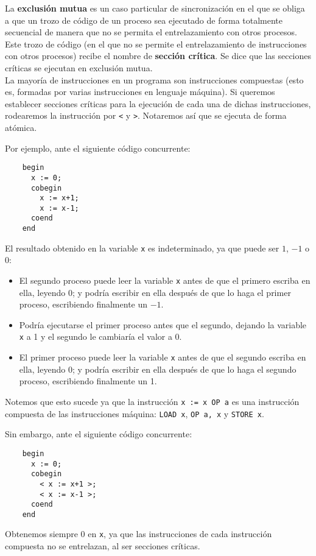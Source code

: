 La \textbf{exclusión mutua} es un caso particular de sincronización en el que se obliga a que un trozo de código de un proceso sea ejecutado de forma totalmente secuencial de manera que no se permita el entrelazamiento con otros procesos. Este trozo de código (en el que no se permite el entrelazamiento de instrucciones con otros procesos) recibe el nombre de \textbf{sección crítica}. Se dice que las secciones críticas se ejecutan en exclusión mutua.\\

La mayoría de instrucciones en un programa son instrucciones compuestas (esto es, formadas por varias instrucciones en lenguaje máquina). Si queremos establecer secciones críticas para la ejecución de cada una de dichas instrucciones, rodearemos la instrucción por \verb|<| y \verb|>|.
Notaremos así que se ejecuta de forma atómica.

\begin{ejemplo}
    Por ejemplo, ante el siguiente código concurrente:
    \begin{verbatim}
    begin
      x := 0;
      cobegin
        x := x+1;
        x := x-1;
      coend
    end
    \end{verbatim}
    El resultado obtenido en la variable \verb|x| es indeterminado, ya que puede ser $1$, $-1$ o $0$:
    \begin{itemize}
        \item El segundo proceso puede leer la variable \verb|x| antes de que el primero escriba en ella, leyendo 0; y podría escribir en ella después de que lo haga el primer proceso, escribiendo finalmente un $-1$.
        \item Podría ejecutarse el primer proceso antes que el segundo, dejando la variable \verb|x| a 1 y el segundo le cambiaría el valor a 0.
        \item El primer proceso puede leer la variable \verb|x| antes de que el segundo escriba en ella, leyendo 0; y podría escribir en ella después de que lo haga el segundo proceso, escribiendo finalmente un 1.
    \end{itemize}
    Notemos que esto sucede ya que la instrucción \verb|x := x OP a| es una instrucción compuesta de las instrucciones máquina: \verb|LOAD x|, \verb|OP a, x| y \verb|STORE x|.

    Sin embargo, ante el siguiente código concurrente:
    \begin{verbatim}
    begin
      x := 0;
      cobegin
        < x := x+1 >;
        < x := x-1 >;
      coend
    end
    \end{verbatim}
    Obtenemos siempre 0 en \verb|x|, ya que las instrucciones de cada instrucción compuesta no se entrelazan, al ser secciones críticas. 
\end{ejemplo}

